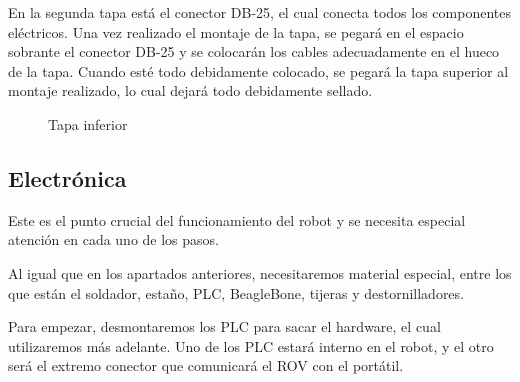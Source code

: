 En la segunda tapa está el conector DB-25, el cual conecta todos los componentes eléctricos. Una vez realizado el montaje de la tapa, se pegará en el espacio sobrante el conector DB-25 y se colocarán los cables adecuadamente en el hueco de la tapa. Cuando esté todo debidamente colocado, se pegará la tapa superior al montaje realizado, lo cual dejará todo debidamente sellado.

\begin{figure}[hbtp]
  \begin{center}
  \end{center}
  \caption{Tapa inferior}
  \label{fig:tapa_iferior}
\end{figure}

\subsection{Electrónica}
\label{subsec:electronica}

Este es el punto crucial del funcionamiento del robot y se necesita especial atención en cada uno de los pasos. 

Al igual que en los apartados anteriores, necesitaremos material especial, entre los que están el soldador, estaño, PLC, BeagleBone, tijeras y destornilladores.

Para empezar, desmontaremos los PLC para sacar el hardware, el cual utilizaremos más adelante.
Uno de los PLC estará interno en el robot, y el otro será el extremo conector que comunicará el ROV con el portátil.

